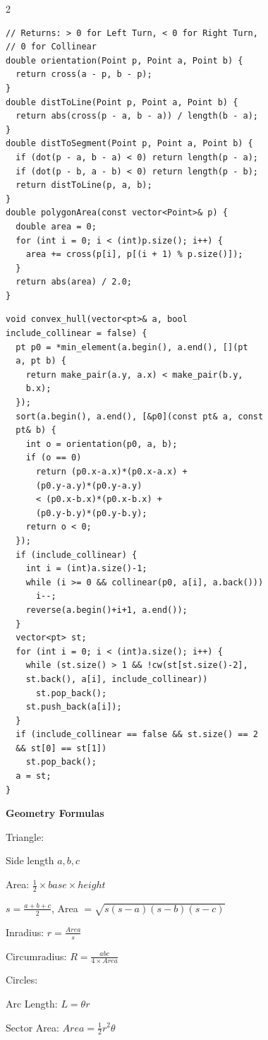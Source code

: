\documentclass[10pt,a4paper]{article}
\begin{document}
\begin{paracol}{2}
\begin{lstlisting}
// Returns: > 0 for Left Turn, < 0 for Right Turn,
// 0 for Collinear
double orientation(Point p, Point a, Point b) {
  return cross(a - p, b - p);
}
double distToLine(Point p, Point a, Point b) {
  return abs(cross(p - a, b - a)) / length(b - a);
}
double distToSegment(Point p, Point a, Point b) {
  if (dot(p - a, b - a) < 0) return length(p - a);
  if (dot(p - b, a - b) < 0) return length(p - b);
  return distToLine(p, a, b);
}
double polygonArea(const vector<Point>& p) {
  double area = 0;
  for (int i = 0; i < (int)p.size(); i++) {
    area += cross(p[i], p[(i + 1) % p.size()]);
  }
  return abs(area) / 2.0;
}
\end{lstlisting}

\begin{lstlisting}
void convex_hull(vector<pt>& a, bool
include_collinear = false) {
  pt p0 = *min_element(a.begin(), a.end(), [](pt
  a, pt b) {
    return make_pair(a.y, a.x) < make_pair(b.y,
    b.x);
  });
  sort(a.begin(), a.end(), [&p0](const pt& a, const
  pt& b) {
    int o = orientation(p0, a, b);
    if (o == 0)
      return (p0.x-a.x)*(p0.x-a.x) +
      (p0.y-a.y)*(p0.y-a.y)
      < (p0.x-b.x)*(p0.x-b.x) +
      (p0.y-b.y)*(p0.y-b.y);
    return o < 0;
  });
  if (include_collinear) {
    int i = (int)a.size()-1;
    while (i >= 0 && collinear(p0, a[i], a.back()))
      i--;
    reverse(a.begin()+i+1, a.end());
  }
  vector<pt> st;
  for (int i = 0; i < (int)a.size(); i++) {
    while (st.size() > 1 && !cw(st[st.size()-2],
    st.back(), a[i], include_collinear))
      st.pop_back();
    st.push_back(a[i]);
  }
  if (include_collinear == false && st.size() == 2
  && st[0] == st[1])
    st.pop_back();
  a = st;
}
\end{lstlisting}

\switchcolumn

\textbf{Geometry Formulas}

Triangle:

Side length $a, b, c$

Area: $\frac{1}{2} \times base \times height$

$s = \frac{a+b+c}{2}$, Area $= \sqrt{s(s-a)(s-b)(s-c)}$

Inradius: $r = \frac{Area}{s}$

Circumradius: $R = \frac{abc}{4 \times Area}$

Circles:

Arc Length: $L = \theta r$

Sector Area: $Area = \frac{1}{2} r^2 \theta$


\end{paracol}
\end{document}
